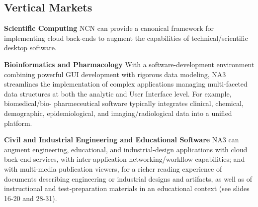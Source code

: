 
\begin{frame}{}
\section{Vertical Markets}

{\thrulex}

{\fontsize{17}{16}\selectfont
\hspace*{15pt}\begin{minipage}{.99\textwidth}
\vspace{-14pt}



		

{\setlength{\leftmargini}{3pt}\begin{enumerate}
\dmitem \textbf{Scientific Computing} \hspace{.5em} 
NCN can provide a canonical framework for 
implementing cloud back-ends to augment 
the capabilities of technical/scientific 
desktop software.
\vspace{16pt}


\dmitem \textbf{Bioinformatics and Pharmacology}  \hspace{.5em} 
With a software-development environment 
combining powerful GUI development with 
rigorous data modeling, NA3 streamlines 
the implementation of complex applications 
managing multi-faceted data structures 
at both the analytic and User Interface 
level.  For example, biomedical/bio- pharmeceutical 
software typically integrates 
clinical, chemical, demographic, epidemiological, 
and imaging/radiological data into a unified 
platform. 
\vspace{16pt}

\dmitem \textbf{Civil and Industrial Engineering and 
Educational Software}  \hspace{.5em} 
NA3 can augment engineering, educational, and 
industrial-design applications with cloud back-end 
services, with inter-application 
networking/workflow capabilities; and with 
multi-media publication viewers, for 
a richer reading experience of documents 
describing engineering or industrial 
designs and artifacts, as well as of 
instructional and test-preparation 
materials in an educational context 
(see slides 16-20 and 28-31).


\end{enumerate}}
\end{minipage}}
\end{frame}
